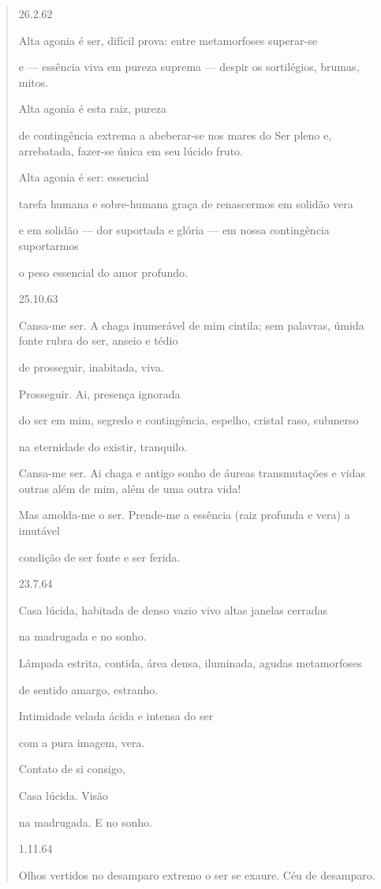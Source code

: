\begin{quote}
26.2.62

Alta agonia é ser, difícil prova: entre metamorfoses superar-se

e --- essência viva em pureza suprema --- despir os sortilégios, brumas,
mitos.

Alta agonia é esta raiz, pureza

de contingência extrema a abeberar-se nos mares do Ser pleno e,
arrebatada, fazer-se única em seu lúcido fruto.

Alta agonia é ser: essencial

tarefa humana e sobre-humana graça de renascermos em solidão vera

e em solidão --- dor suportada e glória --- em nossa contingência
suportarmos

o peso essencial do amor profundo.

25.10.63

Cansa-me ser. A chaga inumerável de mim cintila; sem palavras, úmida
fonte rubra do ser, anseio e tédio

de prosseguir, inabitada, viva.

Prosseguir. Ai, presença ignorada

do ser em mim, segredo e contingência, espelho, cristal raso, submerso

na eternidade do existir, tranquilo.

Cansa-me ser. Ai chaga e antigo sonho de áureas transmutações e vidas
outras além de mim, além de uma outra vida!

Mas amolda-me o ser. Prende-me a essência (raiz profunda e vera) a
imutável

condição de ser fonte e ser ferida.

23.7.64

Casa lúcida, habitada de denso vazio vivo altas janelas cerradas

na madrugada e no sonho.

Lâmpada estrita, contida, área densa, iluminada, agudas metamorfoses

de sentido amargo, estranho.

Intimidade velada ácida e intensa do ser

com a pura imagem, vera.

Contato de si consigo,

Casa lúcida. Visão

na madrugada. E no sonho.

1.11.64

Olhos vertidos no desamparo extremo o ser se exaure. Céu de desamparo.


\end{quote}
